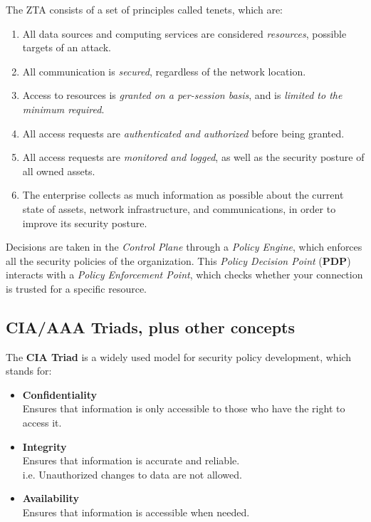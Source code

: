 The ZTA consists of a set of principles called tenets, which are:\ns
\begin{enumerate}
   \item All data sources and computing services are considered \textit{resources}, possible targets of an attack.
   \item All communication is \textit{secured}, regardless of the network location.
   \item Access to resources is \textit{granted on a per-session basis}, and is \textit{limited to the minimum required}.
   \item All access requests are \textit{authenticated and authorized} before being granted.
   \item All access requests are \textit{monitored and logged}, as well as the security posture of all owned assets.
   \item The enterprise collects as much information as possible about the current state of assets, network infrastructure, and communications, in order to improve its security posture.
\end{enumerate}

Decisions are taken in the \textit{Control Plane} through a \textit{Policy Engine}, which enforces all the security policies of the organization. 
This \textit{Policy Decision Point} (\textbf{PDP}) interacts with a \textit{Policy Enforcement Point}, which checks whether your connection is trusted for a specific resource.

\subsection{CIA/AAA Triads, plus other concepts}
The \textbf{CIA Triad} is a widely used model for security policy development, which stands for:
\begin{itemize}
   \item \textbf{Confidentiality}\\
   Ensures that information is only accessible to those who have the right to access it.
   \item \textbf{Integrity}\\
   Ensures that information is accurate and reliable.\\
   i.e. Unauthorized changes to data are not allowed.
   \item \textbf{Availability}\\
   Ensures that information is accessible when needed.
\end{itemize}

